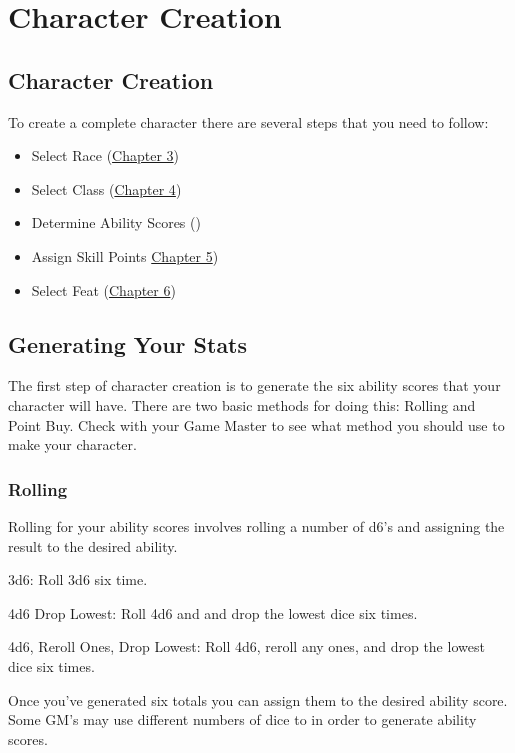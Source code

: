 \chapter{Character Creation}

\section{Character Creation}

To create a complete character there are several steps that you need to follow:

\begin{itemize}
\item Select Race (\hyperlink{chapter.3}{Chapter 3})
\item Select Class (\hyperlink{chapter.4}{Chapter 4})
\item Determine Ability Scores ()
\item Assign Skill Points \hyperlink{chapter.5}{Chapter 5})
\item Select Feat (\hyperlink{chapter.6}{Chapter 6})
\end{itemize}

\section{Generating Your Stats}

The first step of character creation is to generate the six ability scores that your character will have. There are two basic methods for doing this: Rolling and Point Buy. Check with your Game Master to see what method you should use to make your character.

\subsection{Rolling}

Rolling for your ability scores involves rolling a number of d6's and assigning the result to the desired ability.
\begin{itemize*}
	\item{3d6:} Roll 3d6 six time.
	\item{4d6 Drop Lowest:} Roll 4d6 and and drop the lowest dice six times.
	\item{4d6, Reroll Ones, Drop Lowest:} Roll 4d6, reroll any ones, and drop the lowest dice six times.
\end{itemize*}
\vspace*{10pt}
Once you've generated six totals you can assign them to the desired ability score.  Some GM's may use different numbers of dice to in order to generate ability scores.

